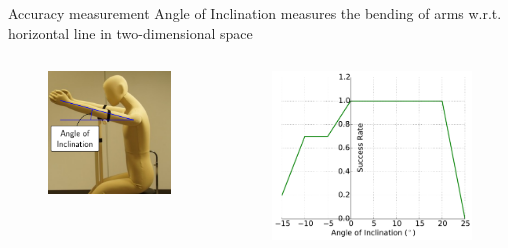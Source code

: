 \documentclass[aspectratio=43,11pt,xcolor={dvipsnames}]{beamer}
\begin{document}
\begin{frame}{Accuracy measurement}
	Angle of Inclination measures the bending of arms w.r.t. horizontal line in two-dimensional space
	\begin{columns}[t]
		\begin{column}{0.4\textwidth}
			\begin{figure}
				\includegraphics[width=\textwidth]{inclination_plus}
			\end{figure}
		\end{column}
								
		\begin{column}{0.5\textwidth}
			\begin{figure}
				\includegraphics[width=\textwidth]{success_rate}
			\end{figure}
		\end{column}
	\end{columns}
\end{frame}
\end{document}

